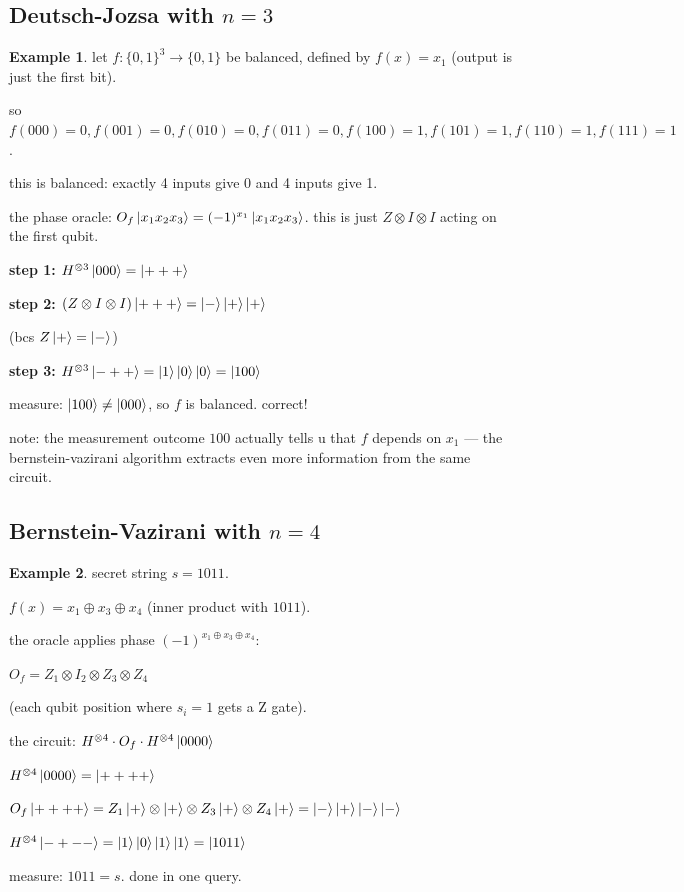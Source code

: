\documentclass[11pt,a4paper]{article}
\theoremstyle{definition}
\newtheorem{example}{Example}[section]
\theoremstyle{remark}
\begin{document}
\subsection{Deutsch-Jozsa with $n = 3$}

\begin{example}
let $f: \{0,1\}^3 \to \{0,1\}$ be balanced, defined by $f(x) = x_1$ (output is just the first bit).

so $f(000) = 0, f(001) = 0, f(010) = 0, f(011) = 0, f(100) = 1, f(101) = 1, f(110) = 1, f(111) = 1$.

this is balanced: exactly 4 inputs give 0 and 4 inputs give 1.

the phase oracle: $O_f\ket{x_1 x_2 x_3} = (-1)^{x_1}\ket{x_1 x_2 x_3}$. this is just $Z \otimes I \otimes I$ acting on the first qubit.

\textbf{step 1:} $H^{\otimes 3}\ket{000} = \ket{+++}$

\textbf{step 2:} $(Z \otimes I \otimes I)\ket{+++} = \ket{-}\ket{+}\ket{+}$

(bcs $Z\ket{+} = \ket{-}$)

\textbf{step 3:} $H^{\otimes 3}\ket{-++} = \ket{1}\ket{0}\ket{0} = \ket{100}$

measure: $\ket{100} \neq \ket{000}$, so $f$ is balanced. correct!

note: the measurement outcome $100$ actually tells u that $f$ depends on $x_1$ --- the bernstein-vazirani algorithm extracts even more information from the same circuit.
\end{example}

\subsection{Bernstein-Vazirani with $n = 4$}

\begin{example}
secret string $s = 1011$.

$f(x) = x_1 \oplus x_3 \oplus x_4$ (inner product with $1011$).

the oracle applies phase $(-1)^{x_1 \oplus x_3 \oplus x_4}$:

$O_f = Z_1 \otimes I_2 \otimes Z_3 \otimes Z_4$

(each qubit position where $s_i = 1$ gets a Z gate).

the circuit: $H^{\otimes 4} \cdot O_f \cdot H^{\otimes 4}\ket{0000}$

$H^{\otimes 4}\ket{0000} = \ket{++++}$

$O_f\ket{++++} = Z_1\ket{+} \otimes \ket{+} \otimes Z_3\ket{+} \otimes Z_4\ket{+} = \ket{-}\ket{+}\ket{-}\ket{-}$

$H^{\otimes 4}\ket{-+-{-}} = \ket{1}\ket{0}\ket{1}\ket{1} = \ket{1011}$

measure: $1011 = s$. done in one query.
\end{example}
\end{document}
